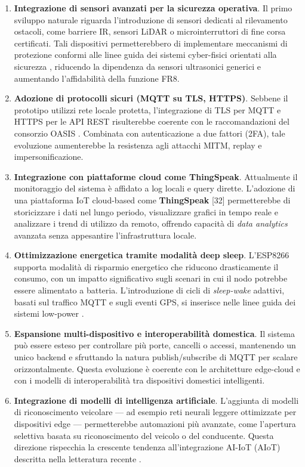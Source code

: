 \begin{enumerate}
    \item \textbf{Integrazione di sensori avanzati per la sicurezza operativa}. Il primo sviluppo naturale riguarda l'introduzione di sensori dedicati al rilevamento ostacoli, come barriere IR, sensori LiDAR o microinterruttori di fine corsa certificati. Tali dispositivi permetterebbero di implementare meccanismi di protezione conformi alle linee guida dei sistemi cyber-fisici orientati alla sicurezza \cite{Lee2015}, riducendo la dipendenza da sensori ultrasonici generici e aumentando l'affidabilità della funzione FR8.
    
    \item \textbf{Adozione di protocolli sicuri (MQTT su TLS, HTTPS)}. Sebbene il prototipo utilizzi rete locale protetta, l'integrazione di TLS per MQTT e HTTPS per le API REST risulterebbe coerente con le raccomandazioni del consorzio OASIS \cite{MQTT5}. Combinata con autenticazione a due fattori (2FA), tale evoluzione aumenterebbe la resistenza agli attacchi MITM, replay e impersonificazione.
    
    \item \textbf{Integrazione con piattaforme cloud come ThingSpeak}. Attualmente il monitoraggio del sistema è affidato a log locali e query dirette. L'adozione di una piattaforma IoT cloud-based come \textbf{ThingSpeak} [32] permetterebbe di storicizzare i dati nel lungo periodo, visualizzare grafici in tempo reale e analizzare i trend di utilizzo da remoto, offrendo capacità di \textit{data analytics} avanzata senza appesantire l'infrastruttura locale.
    
    \item \textbf{Ottimizzazione energetica tramite modalità deep sleep}. L'ESP8266 supporta modalità di risparmio energetico che riducono drasticamente il consumo, con un impatto significativo sugli scenari in cui il nodo potrebbe essere alimentato a batteria. L'introduzione di cicli di \textit{sleep-wake} adattivi, basati sul traffico MQTT e sugli eventi GPS, si inserisce nelle linee guida dei sistemi low-power \cite{Gubbi2013}.
    
    \item \textbf{Espansione multi-dispositivo e interoperabilità domestica}. Il sistema può essere esteso per controllare più porte, cancelli o accessi, mantenendo un unico backend e sfruttando la natura publish/subscribe di MQTT per scalare orizzontalmente. Questa evoluzione è coerente con le architetture edge-cloud e con i modelli di interoperabilità tra dispositivi domestici intelligenti.
    
    \item \textbf{Integrazione di modelli di intelligenza artificiale}. L'aggiunta di modelli di riconoscimento veicolare — ad esempio reti neurali leggere ottimizzate per dispositivi edge — permetterebbe automazioni più avanzate, come l'apertura selettiva basata su riconoscimento del veicolo o del conducente. Questa direzione rispecchia la crescente tendenza all'integrazione AI-IoT (AIoT) descritta nella letteratura recente \cite{Tang2022}.
\end{enumerate}

